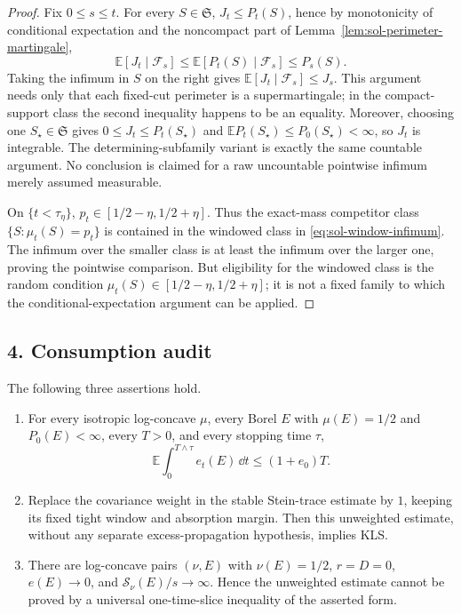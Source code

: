 \documentclass[../main.tex]{subfiles}
\begin{document}
\begin{proof}
Fix $0\leq s\leq t$.  For every $S\in\mathfrak S$, $J_t\leq P_t(S)$, hence by monotonicity of
conditional expectation and the noncompact part of
Lemma~\ref{lem:sol-perimeter-martingale},
\[
  \mathbb E[J_t\mid\mathcal F_s]
  \leq\mathbb E[P_t(S)\mid\mathcal F_s]
  \leq P_s(S).
\]
Taking the infimum in $S$ on the right gives
$\mathbb E[J_t\mid\mathcal F_s]\leq J_s$.  This argument needs only that each fixed-cut
perimeter is a supermartingale; in the compact-support class the second inequality happens to
be an equality.  Moreover, choosing one $S_\star\in\mathfrak S$ gives
$0\leq J_t\leq P_t(S_\star)$ and
$\mathbb E P_t(S_\star)\leq P_0(S_\star)<\infty$, so $J_t$ is integrable.
The determining-subfamily variant is exactly the same countable argument.  No conclusion is
claimed for a raw uncountable pointwise infimum merely assumed measurable.

On $\{t<\tau_\eta\}$, $p_t\in[1/2-\eta,1/2+\eta]$.  Thus the exact-mass competitor class
$\{S:\mu_t(S)=p_t\}$ is contained in the windowed class in
\eqref{eq:sol-window-infimum}.  The infimum over the smaller class is at least the infimum over
the larger one, proving the pointwise comparison.  But eligibility for the windowed class is
the random condition $\mu_t(S)\in[1/2-\eta,1/2+\eta]$; it is not a fixed family to which the
conditional-expectation argument can be applied.
\end{proof}

\subsection*{4. Consumption audit}

\begin{proposition}
\label{prop:sol-intro-audit}
The following three assertions hold.
\begin{enumerate}
  \item For every isotropic log-concave $\mu$, every Borel $E$ with $\mu(E)=1/2$ and
  $P_0(E)<\infty$, every $T>0$, and every stopping time $\tau$,
  \[
    \mathbb E\int_0^{T\wedge\tau}e_t(E)\,\dd t\leq(1+e_0)T.
  \]
  \item Replace the covariance weight in the stable Stein-trace estimate by $1$, keeping its
  fixed tight window and absorption margin.  Then this unweighted estimate, without any
  separate excess-propagation hypothesis, implies KLS.
  \item There are log-concave pairs $(\nu,E)$ with $\nu(E)=1/2$, $r=D=0$,
  $e(E)\to0$, and $\mathcal S_\nu(E)/s\to\infty$.  Hence the unweighted estimate cannot be
  proved by a universal one-time-slice inequality of the asserted form.
\end{enumerate}
\end{proposition}
\end{document}

